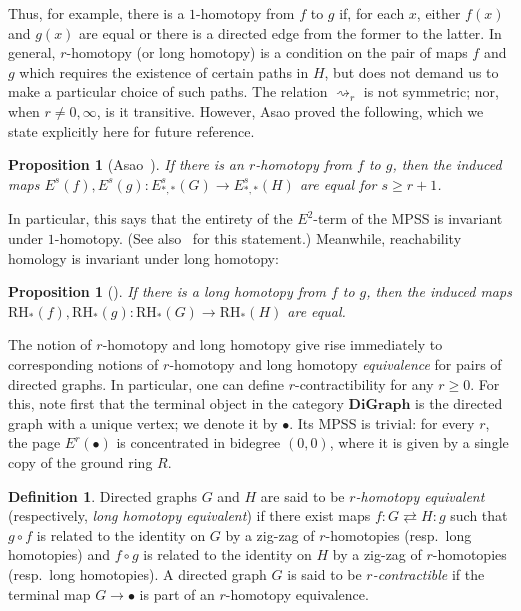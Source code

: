 \documentclass[a4paper, 11 pt, oneside, reqno]{amsart}
\numberwithin{lemma}{section}
\newtheorem{proposition}[lemma]{Proposition}
\theoremstyle{definition}
\newtheorem{definition}[lemma]{Definition}
\newcommand{\demph}[1]{\emph{#1}}
\newcommand{\cn}[1]{\mathbf{#1}}
\newcommand{\DiGraph}{\cn{DiGraph}}
\newcommand{\RH}{\mathrm{RH}}
\begin{document}
Thus, for example, there is a \(1\)-homotopy from $f$ to $g$ if, for each $x$, either $f(x)$ and $g(x)$ are equal or there is a directed edge from the former to the latter. In general, \(r\)-homotopy (or long homotopy) is a condition on the pair of maps \(f\) and \(g\) which requires the existence of certain paths in \(H\), but does not demand us to make a particular choice of such paths. The relation \(\rightsquigarrow_r\) is not symmetric; nor, when \(r \neq 0, \infty\), is it transitive. However, Asao proved the following, which we state explicitly here
for future reference.

\begin{proposition}[{Asao~\cite[Theorem~1.3]{Asao-filtered}}]
\label{r-homotopy-invariance}
    If there is an \(r\)-homotopy from $f$ to $g$, then the induced maps 
    $E^s(f),E^s(g)\colon E^s_{\ast,\ast}(G)\to E^s_{\ast,\ast}(H)$ 
    are equal for $s\geqslant r+1$.
\end{proposition}

In particular, this says that the entirety of the $E^2$-term of the MPSS is invariant under $1$-homotopy. (See also~\cite[Proposition~5.7]{Asao-path} for this statement.) Meanwhile, reachability homology is invariant under long homotopy:

\begin{proposition}[{\cite[Theorem 4.4]{HepworthRoff2023}}]
    If there is a long homotopy from \(f\) to \(g\), then the induced maps \(\RH_\ast(f), \RH_\ast(g)\colon \RH_\ast(G) \to \RH_\ast(H)\) are equal.
\end{proposition}

The notion of \(r\)-homotopy and long homotopy give rise immediately to corresponding notions of \(r\)-homotopy and long homotopy \emph{equivalence} for pairs of directed graphs. In particular, one can define \(r\)-contractibility for any \(r \geq 0\). For this, note first that the terminal object in the category \(\DiGraph\) is the directed graph with a unique vertex; we denote it by \(\bullet\). Its MPSS is trivial: for every \(r\), the page \(E^r(\bullet)\) is concentrated in bidegree \((0,0)\), where it is given by a single copy of the ground ring \(R\).

\begin{definition}
    Directed graphs \(G\) and \(H\) are said to be \demph{\(r\)-homotopy equivalent} (respectively, \demph{long homotopy equivalent}) if there exist maps \(f\colon G \rightleftarrows H : g\) such that \(g \circ f\) is related to the identity on \(G\) by a zig-zag of \(r\)-homotopies (resp.~long homotopies) and \(f \circ g\) is related to the identity on \(H\) by a zig-zag of \(r\)-homotopies (resp.~long homotopies). A directed graph \(G\) is said to be \demph{\(r\)-contractible} if the terminal map \(G \to \bullet\) is part of an \(r\)-homotopy equivalence.
\end{definition}
\end{document}
